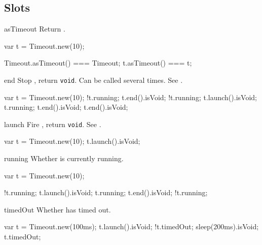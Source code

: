 \subsection{Slots}
\begin{urbiscriptapi}
\item[asTimeout] Return \this.
\begin{urbiassert}
var t = Timeout.new(10);

Timeout.asTimeout() === Timeout;
      t.asTimeout() === t;
\end{urbiassert}


\item[end] Stop \this, return \lstinline|void|.  Can be called several
  times.  See .

\begin{urbiassert}
var t = Timeout.new(10);
!t.running;
 t.end().isVoid;
!t.running;
t.launch().isVoid;
 t.running;
 t.end().isVoid;
 t.end().isVoid;
\end{urbiassert}


\item[launch]
  Fire \this, return \lstinline|void|.  See .

\begin{urbiassert}
var t = Timeout.new(10);
t.launch().isVoid;
\end{urbiassert}


\item[running]
  Whether is currently running.
\begin{urbiassert}
var t = Timeout.new(10);

!t.running;
 t.launch().isVoid;
 t.running;
 t.end().isVoid;
!t.running;
\end{urbiassert}


\item[timedOut]
  Whether \this has timed out.

\begin{urbiassert}
var t = Timeout.new(100ms);
 t.launch().isVoid;
!t.timedOut;
 sleep(200ms).isVoid;
 t.timedOut;
\end{urbiassert}


\end{urbiscriptapi}

